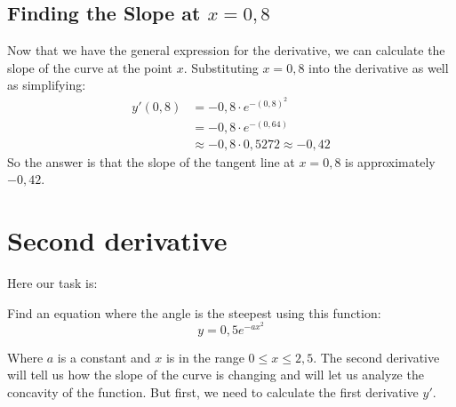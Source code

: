 \documentclass[a4paper,12pt]{article}
\begin{document}
  \subsection{Finding the Slope at $x = 0,8$}
  Now that we have the general expression for the derivative, we can calculate the slope of the curve at the point $x$. Substituting $x = 0,8$ into the derivative as well as simplifying:
  \begin{equation}
    \begin{split}
      y'(0,8) & = -0,8 \cdot e^{-\left(0,8\right)^2} \\
              & = -0,8 \cdot e^{-\left(0,64\right)} \\
              & \approx -0,8 \cdot 0,5272 \approx -0,42
    \end{split}
  \end{equation}
  So the answer is that the slope of the tangent line at $x = 0,8$ is approximately $-0,42$.
\section{Second derivative}
\label{sec:uppg2}
Here our task is:\\
\begin{addmargin}[1em]{1em}
  Find an equation where the angle is the steepest using this function:
  \begin{displaymath}
    y = 0,5e^{-ax^2}
  \end{displaymath}
\end{addmargin}
Where $a$ is a constant and $x$ is in the range $0 \leq x \leq 2,5$. The second derivative will tell us how the slope of the curve is changing and will let us analyze the concavity of the function. But first, we need to calculate the first derivative $y'$.
\end{document}
